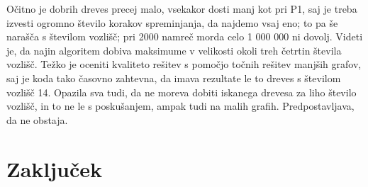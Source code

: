 \documentclass[a4paper, 12 pt]{article}
\begin{document}
Očitno je dobrih dreves precej malo, vsekakor dosti manj kot pri P1, saj je treba izvesti ogromno število korakov spreminjanja, da najdemo vsaj eno; to pa še narašča s številom vozlišč; pri 2000 namreč morda celo 1 000 000 ni dovolj. Videti je, da najin algoritem dobiva maksimume v velikosti okoli treh četrtin števila vozlišč. Težko je oceniti kvaliteto rešitev s pomočjo točnih rešitev manjših grafov, saj je koda tako časovno zahtevna, da imava rezultate le to dreves s številom vozlišč 14. Opazila sva tudi, da ne moreva dobiti iskanega drevesa za liho število vozlišč, in to ne le s poskušanjem, ampak tudi na malih grafih. Predpostavljava, da ne obstaja.

\section{Zaključek}
\end{document}
